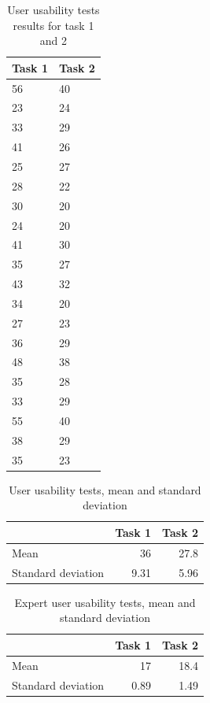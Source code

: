 \begin{table}[]
\centering
\begin{tabular}{|l|l|}
\hline
Task 1 & Task 2 \\ \hline
56 & 40 \\ \hline
23 & 24 \\ \hline
33 & 29 \\ \hline
41 & 26 \\ \hline
25 & 27 \\ \hline
28 & 22 \\ \hline
30 & 20 \\ \hline
24 & 20 \\ \hline
41 & 30 \\ \hline
35 & 27 \\ \hline
43 & 32 \\ \hline
34 & 20 \\ \hline
27 & 23 \\ \hline
36 & 29 \\ \hline
48 & 38 \\ \hline
35 & 28 \\ \hline
33 & 29 \\ \hline
55 & 40 \\ \hline
38 & 29 \\ \hline
35 & 23 \\ \hline
\end{tabular}
\caption{User usability tests results for task 1 and 2}
\label{eval:automation1}
\end{table}

\begin{table}[]
\centering
\begin{tabular}{l|r|r|}
\cline{2-3}
 & \multicolumn{1}{l|}{Task 1} & \multicolumn{1}{l|}{Task 2} \\ \hline
\multicolumn{1}{|l|}{Mean} & 36 & 27.8 \\ \hline
\multicolumn{1}{|l|}{Standard deviation} & 9.31 & 5.96 \\ \hline
\end{tabular}
\caption{User usability tests, mean and standard deviation}
\label{eval:automation2}
\end{table}


\begin{table}[]
\centering
\begin{tabular}{l|r|r|}
\cline{2-3}
 & \multicolumn{1}{l|}{Task 1} & \multicolumn{1}{l|}{Task 2} \\ \hline
\multicolumn{1}{|l|}{Mean} & 17 & 18.4 \\ \hline
\multicolumn{1}{|l|}{Standard deviation} & 0.89 & 1.49 \\ \hline
\end{tabular}
\caption{Expert user usability tests, mean and standard deviation}
\label{eval:automation3}
\end{table}


